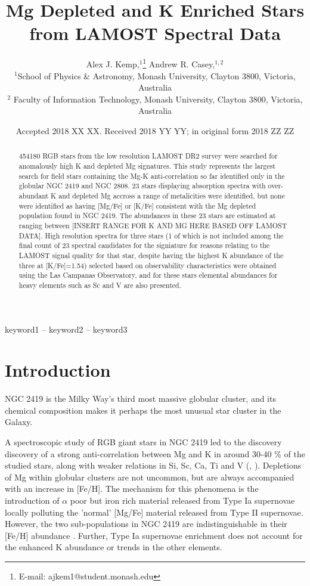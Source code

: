 \documentclass[a4paper,fleqn,usenatbib]{mnras}
\title[Short title, max. 45 characters]{Mg Depleted and K Enriched Stars from LAMOST Spectral Data}
\author[Kemp et al.]{
Alex J. Kemp,$^{1}$\thanks{E-mail: ajkem1@student.monash.edu}
Andrew R. Casey,$^{1,2}$
\\
$^{1}$School of Physics \& Astronomy, Monash University, Clayton 3800, Victoria, Australia\\
$^{2}$ Faculty of Information Technology, Monash University, Clayton 3800, Victoria, Australia\\
}
\date{Accepted 2018 XX XX. Received 2018 YY YY; in original form 2018 ZZ ZZ}
\begin{document}
\label{firstpage}
\pagerange{\pageref{firstpage}--\pageref{lastpage}}
\maketitle

\begin{abstract}
454180 RGB stars from the low resolution LAMOST DR2 survey were searched for anomalously high K and depleted Mg signatures. This study represents the largest search for field stars containing the Mg-K anti-correlation so far identified only in the globular NGC 2419 and NGC 2808. 23 stars displaying absorption spectra with over-abundant K and depleted Mg accross a range of metalicities were identified, but none were identified as having [Mg/Fe] or [K/Fe] consistent with the Mg depleted population found in NGC 2419. The abundances in these 23 stars are estimated at ranging between [INSERT RANGE FOR K AND MG HERE BASED OFF LAMOST DATA]. High resolution spectra for three stars (1 of which is not included among the final count of 23 spectral candidates for the signiature for reasons relating to the LAMOST signal quality for that star, despite having the highest K abundance of the three at [K/Fe]=1.54) selected based on observability characteristics were obtained using the Las Campanas Observatory, and for these stars elemental abundances for heavy elements such as Sc and V are also presented.
\end{abstract}

\begin{keywords}
keyword1 -- keyword2 -- keyword3
\end{keywords}



\section{Introduction}

NGC 2419 is the Milky Way's third most massive globular cluster, and its chemical composition makes it perhaps the most unusual star cluster in the Galaxy.

A spectroscopic study of RGB giant stars in NGC 2419 led to the discovery discovery of a strong anti-correlation between Mg and K in around 30-40 \% of the studied stars, along with weaker relations in Si, Sc, Ca, Ti and V (\citet{mucciarelli2012}, \citet{cohenkirby2012}). Depletions of Mg within globular clusters are not uncommon, but are always accompanied with an increase in [Fe/H]. The mechanism for this phenomena is the introduction of $\alpha$ poor but iron rich material released from Type Ia supernovae locally polluting the 'normal' [Mg/Fe] material released from Type II supernovae. However, the two sub-populations in NGC 2419 are indistinguishable in their [Fe/H] abundance \citep{cohenkirby2012}. Further, Type Ia supernovae enrichment does not account for the enhanced K abundance or trends in the other elements.
\end{document}
